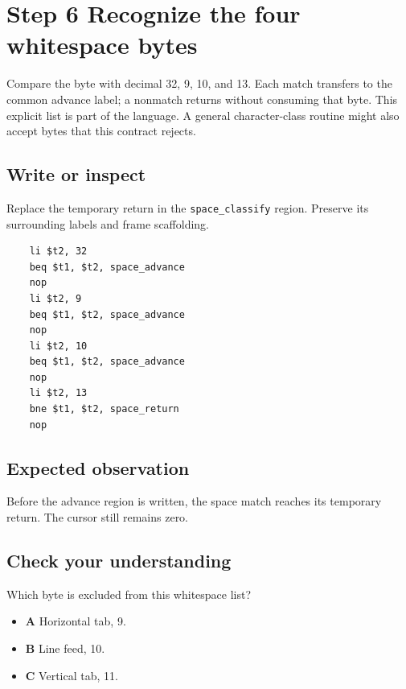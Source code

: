 \section{Step 6 Recognize the four whitespace bytes}\label{expression-s06}

Compare the byte with decimal 32, 9, 10, and 13. Each match transfers to the common advance label; a nonmatch returns without consuming that byte. This explicit list is part of the language. A general character-class routine might also accept bytes that this contract rejects.

\subsection{Write or inspect}
Replace the temporary return in the \texttt{space\_classify} region. Preserve its surrounding labels and frame scaffolding.

\begin{verbatim}
    li $t2, 32
    beq $t1, $t2, space_advance
    nop
    li $t2, 9
    beq $t1, $t2, space_advance
    nop
    li $t2, 10
    beq $t1, $t2, space_advance
    nop
    li $t2, 13
    bne $t1, $t2, space_return
    nop
\end{verbatim}
\subsection{Expected observation}
Before the advance region is written, the space match reaches its temporary return. The cursor still remains zero.

\subsection{Check your understanding}
Which byte is excluded from this whitespace list?

\begin{itemize}
  \item \textbf{A} Horizontal tab, 9.
  \item \textbf{B} Line feed, 10.
  \item \textbf{C} Vertical tab, 11.
\end{itemize}
